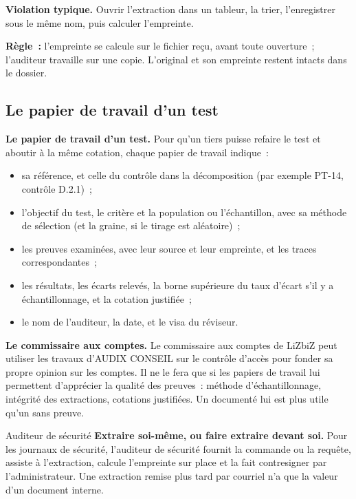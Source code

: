\begin{boxalert}
\textbf{Violation typique.} Ouvrir l'extraction dans un tableur, la trier,
l'enregistrer sous le même nom, puis calculer l'empreinte.

\smallskip
\textbf{Règle~:} l'empreinte se calcule sur le fichier reçu, avant toute
ouverture~; l'auditeur travaille sur une copie. L'original et son empreinte
restent intacts dans le dossier.
\end{boxalert}

\subsection{Le papier de travail d'un test}

\begin{boxprocedure}
\textbf{Le papier de travail d'un test.} Pour qu'un tiers puisse refaire le
test et aboutir à la même cotation, chaque papier de travail indique~:
\begin{itemize}
    \item sa référence, et celle du contrôle dans la décomposition (par
          exemple PT-14, contrôle D.2.1)~;
    \item l'objectif du test, le critère et la population ou l'échantillon,
          avec sa méthode de sélection (et la graine, si le tirage est
          aléatoire)~;
    \item les preuves examinées, avec leur source et leur empreinte, et les
          traces correspondantes~;
    \item les résultats, les écarts relevés, la borne supérieure du taux
          d'écart s'il y a échantillonnage, et la cotation justifiée~;
    \item le nom de l'auditeur, la date, et le visa du réviseur.
\end{itemize}
\end{boxprocedure}

\begin{boxinfo}
\textbf{Le commissaire aux comptes.} Le commissaire aux comptes de LiZbiZ
peut utiliser les travaux d'AUDIX CONSEIL sur le contrôle d'accès pour
fonder sa propre opinion sur les comptes. Il ne le fera que si les papiers
de travail lui permettent d'apprécier la qualité des preuves~: méthode
d'échantillonnage, intégrité des extractions, cotations justifiées. Un
\NEK{} documenté lui est plus utile qu'un \OUI{} sans preuve.
\end{boxinfo}

\begin{boxmetier}{Auditeur de sécurité}
\textbf{Extraire soi-même, ou faire extraire devant soi.} Pour les
journaux de sécurité, l'auditeur de sécurité fournit la commande ou la
requête, assiste à l'extraction, calcule l'empreinte sur place et la fait
contresigner par l'administrateur. Une extraction remise plus tard par
courriel n'a que la valeur d'un document interne.
\end{boxmetier}

